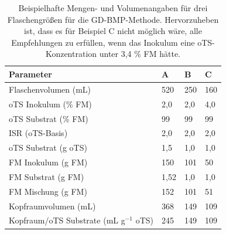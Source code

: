 \documentclass[]{article}
\begin{document}
\begin{table}[h] 
\centering
\caption{Beispielhafte Mengen- und Volumenangaben für drei Flaschengrößen für die GD-BMP-Methode. Hervorzuheben ist, dass es für Beispiel C nicht möglich wäre, alle Empfehlungen zu erfüllen, wenn das Inokulum eine oTS-Konzentration unter 3,4 \% FM hätte.}
\label{tab:examples}
\begin{tabular}{llll}
\hline
Parameter                     & A    & B   & C   \\
\hline
Flaschenvolumen (mL)      & 520  & 250 & 160 \\
oTS Inokulum (\% FM)           & 2,0  & 2,0 & 4,0 \\
oTS Substrat (\% FM)          & 99   & 99  & 99  \\
ISR (oTS-Basis)                & 2,0  & 2,0 & 2,0 \\
oTS Substrat (g oTS)            & 1,5 & 1,0 & 1,0 \\
FM Inokulum (g FM)       & 150  & 101 & 50  \\
FM Substrat (g FM)              & 1,52 & 1,0 & 1,0 \\
FM Mischung (g FM)              & 152  & 101 & 51  \\
Kopfraumvolumen (mL)         & 368  & 149 & 109 \\
Kopfraum/oTS Substrate (mL g$^{-1}$ oTS) & 245  & 149 & 109 \\
\hline
\end{tabular}
\end{table}
\end{document}
